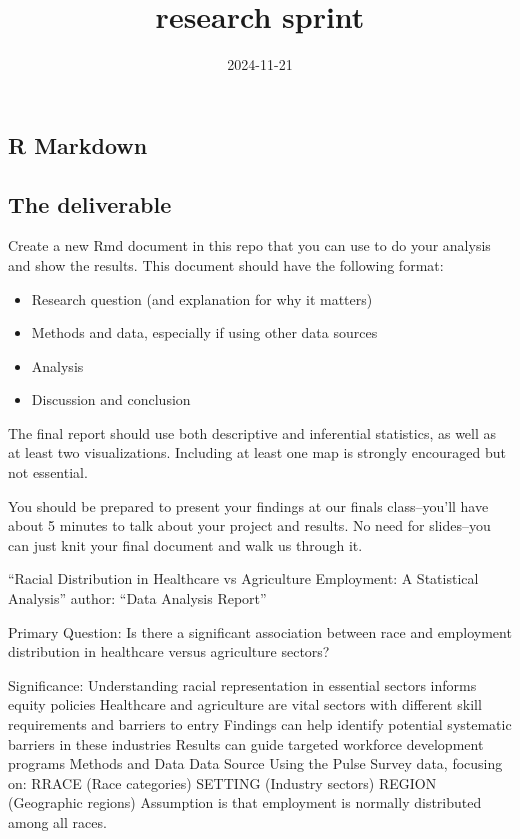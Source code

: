 \documentclass[
]{article}
\title{research sprint}
\author{}
\date{\vspace{-2.5em}2024-11-21}
\providecommand{\tightlist}{%
  \setlength{\itemsep}{0pt}\setlength{\parskip}{0pt}}
\begin{document}
\maketitle

\subsection{R Markdown}\label{r-markdown}

\subsection{The deliverable}\label{the-deliverable}

Create a new Rmd document in this repo that you can use to do your
analysis and show the results. This document should have the following
format:

\begin{itemize}
\tightlist
\item
  Research question (and explanation for why it matters)
\item
  Methods and data, especially if using other data sources
\item
  Analysis
\item
  Discussion and conclusion
\end{itemize}

The final report should use both descriptive and inferential statistics,
as well as at least two visualizations. Including at least one map is
strongly encouraged but not essential.

You should be prepared to present your findings at our finals
class--you'll have about 5 minutes to talk about your project and
results. No need for slides--you can just knit your final document and
walk us through it.

``Racial Distribution in Healthcare vs Agriculture Employment: A
Statistical Analysis'' author: ``Data Analysis Report''

Primary Question: Is there a significant association between race and
employment distribution in healthcare versus agriculture sectors?

Significance: Understanding racial representation in essential sectors
informs equity policies Healthcare and agriculture are vital sectors
with different skill requirements and barriers to entry Findings can
help identify potential systematic barriers in these industries Results
can guide targeted workforce development programs Methods and Data Data
Source Using the Pulse Survey data, focusing on: RRACE (Race categories)
SETTING (Industry sectors) REGION (Geographic regions) Assumption is
that employment is normally distributed among all races.
\end{document}
